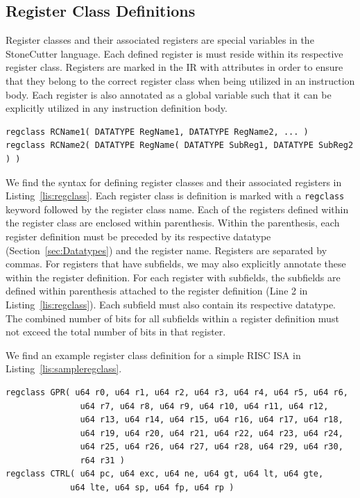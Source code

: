 \documentclass{article}
\begin{document}
\clearpage
\subsection{Register Class Definitions}
\label{sec:RegClassDef}

Register classes and their associated registers are special variables in the StoneCutter language.  Each defined register 
is must reside within its respective register class.  Registers are marked in the IR with attributes in order to ensure that 
they belong to the correct register class when being utilized in an instruction body.  Each register is also annotated as a global 
variable such that it can be explicitly utilized in any instruction definition body.

\vspace{0.125in}
\begin{lstlisting}[frame=single,style=base,caption={Register Class Definition Syntax},captionpos=b,label={lis:regclass}]
regclass RCName1( DATATYPE RegName1, DATATYPE RegName2, ... )
regclass RCName2( DATATYPE RegName( DATATYPE SubReg1, DATATYPE SubReg2 ) )
\end{lstlisting}

We find the syntax for defining register classes and their associated registers in Listing~\ref{lis:regclass}.  Each register 
class is definition is marked with a \texttt{regclass} keyword followed by the register class name.  Each of the registers 
defined within the register class are enclosed within parenthesis.  Within the parenthesis, each register definition must 
be preceded by its respective datatype (Section~\ref{sec:Datatypes}) and the register name.  Registers are separated 
by commas.  For registers that have subfields, we may also explicitly annotate these within the register definition.  For 
each register with subfields, the subfields are defined within parenthesis attached to the register definition 
(Line 2 in Listing~\ref{lis:regclass}).  Each subfield must also contain its respective datatype.  The combined number of bits for 
all subfields within a register definition must not exceed the total number of bits in that register.  

We find an example register class definition for a simple RISC ISA in Listing~\ref{lis:sampleregclass}.  

\vspace{0.125in}
\begin{lstlisting}[frame=single,style=base,caption={Sample Register Class Definition},captionpos=b,label={lis:sampleregclass}]
regclass GPR( u64 r0, u64 r1, u64 r2, u64 r3, u64 r4, u64 r5, u64 r6, 
		       u64 r7, u64 r8, u64 r9, u64 r10, u64 r11, u64 r12, 
		       u64 r13, u64 r14, u64 r15, u64 r16, u64 r17, u64 r18,
		       u64 r19, u64 r20, u64 r21, u64 r22, u64 r23, u64 r24, 
		       u64 r25, u64 r26, u64 r27, u64 r28, u64 r29, u64 r30,
		       r64 r31 )
regclass CTRL( u64 pc, u64 exc, u64 ne, u64 gt, u64 lt, u64 gte,
			 u64 lte, u64 sp, u64 fp, u64 rp )
\end{lstlisting}
\end{document}

